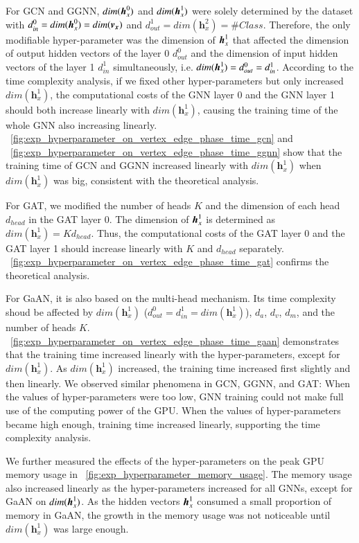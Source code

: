 For GCN and GGNN, $dim(\boldsymbol{h}^0_x)$ and $dim(\boldsymbol{h}^1_x)$ were solely determined by the dataset with $d^0_{in} = dim(\boldsymbol{h}^0_x) = dim(\boldsymbol{v_x})$ and $d^1_{out} = dim(\boldsymbol{h}^2_x)=\#Class$.
%
Therefore, the only modifiable hyper-parameter was the dimension of $\boldsymbol{h}^1_x$ that affected the dimension of output hidden vectors of the layer 0 $d^0_{out}$ and the dimension of input hidden vectors of the layer 1 $d^1_{in}$ simultaneously, i.e. $dim(\boldsymbol{h}^1_x)  = d^0_{out} = d^1_{in}$.
%
According to the time complexity analysis, if we fixed other hyper-parameters but only increased $dim(\boldsymbol{h}^1_x)$, the computational costs of the GNN layer 0 and the GNN layer 1 should both increase linearly with $dim(\boldsymbol{h}^1_x)$, causing the training time of the whole GNN also increasing linearly. 
%
\figurename~\ref{fig:exp_hyperparameter_on_vertex_edge_phase_time_gcn} and \figurename~\ref{fig:exp_hyperparameter_on_vertex_edge_phase_time_ggnn} show that the training time of GCN and GGNN increased linearly with $dim(\boldsymbol{h}^1_x)$ when $dim(\boldsymbol{h}^1_x)$ was big, consistent with the theoretical analysis.

For GAT, we modified the number of heads $K$ and the dimension of each head $d_{head}$ in the GAT layer 0.
%
The dimension of $\boldsymbol{h}^1_x$ is determined as $dim(\boldsymbol{h}^1_x) = K d_{head}$.
%
Thus, the computational costs of the GAT layer 0 and the GAT layer 1 should increase linearly with $K$ and $d_{head}$ separately. 
%
\figurename~\ref{fig:exp_hyperparameter_on_vertex_edge_phase_time_gat} confirms the theoretical analysis.

For GaAN, it is also based on the multi-head mechanism.
%
Its time complexity shoud be affected by $dim(\boldsymbol{h}^1_x)$ ($d^0_{out} = d^1_{in} = dim(\boldsymbol{h}^1_x)$), $d_a$, $d_v$, $d_m$, and the number of heads $K$.
%
\figurename~\ref{fig:exp_hyperparameter_on_vertex_edge_phase_time_gaan} demonstrates that the training time increased linearly with the hyper-parameters, except for $dim(\boldsymbol{h}^1_x)$.
As $dim(\boldsymbol{h}^1_x)$ increased, the training time increased first slightly and then linearly.
We observed similar phenomena in GCN, GGNN, and GAT:
When the values of hyper-parameters were too low, GNN training could not make full use of the computing power of the GPU.
%
When the values of hyper-parameters became high enough, training time increased linearly, supporting the time complexity analysis.

We further measured the effects of the hyper-parameters on the peak GPU memory usage in \figurename~\ref{fig:exp_hyperparameter_memory_usage}.
%
The memory usage also increased linearly as the hyper-parameters increased for all GNNs, except for GaAN on $dim(\boldsymbol{h}^1_x)$.
%
As the hidden vectors $\boldsymbol{h}^1_x$ consumed a small proportion of memory in GaAN, the growth in the memory usage was not noticeable until $dim(\boldsymbol{h}^1_x)$ was large enough.

